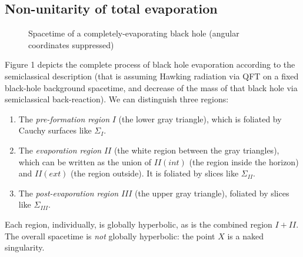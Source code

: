 \documentclass{article}
\begin{document}
\subsection{Non-unitarity of total evaporation}


\begin{figure}
\caption{Spacetime of a completely-evaporating black hole (angular coordinates suppressed)}
\end{figure}

Figure 1 depicts the complete process of black hole evaporation according to the semiclassical description (that is assuming Hawking radiation via QFT on a fixed black-hole background spacetime, and decrease of the mass of that black hole via semiclassical back-reaction). We can distinguish three regions:
\begin{enumerate}
\item The \emph{pre-formation region} $I$ (the lower gray triangle), which is foliated by Cauchy surfaces like $\Sigma_I$.
\item The \emph{evaporation region} $II$ (the white region between the gray triangles), which can be written as the union of $II(int)$ (the region inside the horizon) and $II(ext)$ (the region outside). It is foliated by slices like $\Sigma_{II}$.
\item The \emph{post-evaporation region} $III$ (the upper gray triangle), foliated by slices like $\Sigma_{III}$.
\end{enumerate}
Each region, individually, is globally hyperbolic, as is the combined region $I+II$. The overall spacetime is \emph{not} globally hyperbolic: the point $X$ is a naked singularity.
\end{document}
